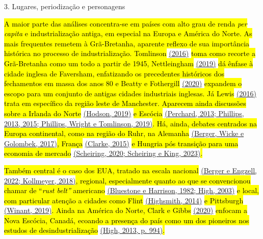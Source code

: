 3. Lugares, periodização e personagens

\hl{A maior parte das análises concentra-se em países com alto grau de
renda \emph{per capita} e industrialização antiga, em especial na Europa
e América do Norte. As mais frequentes remetem à Grã-Bretanha, aparente
reflexo de sua importância histórica no processo de industrialização.
Tomlinson} \href{https://www.zotero.org/google-docs/?PSiiOG}{(2016)}
\hl{toma como recorte a Grã-Bretanha como um todo a partir de 1945,
Nettleingham} \href{https://www.zotero.org/google-docs/?DzKgjo}{(2019)}
\hl{dá ênfase à cidade inglesa de Faversham, enfatizando os precedentes
históricos dos fechamentos em massa dos anos 80 e Beatty e Fothergill}
\href{https://www.zotero.org/google-docs/?iHJANV}{(2020)} \hl{expandem o
escopo para um conjunto de antigas cidades industriais inglesas. Já
Lewis} \href{https://www.zotero.org/google-docs/?cZ7T4H}{(2016)}
\hl{trata em específico da região leste de Manchester. Aparecem ainda
discussões sobre a Irlanda do Norte}
\href{https://www.zotero.org/google-docs/?adDhwJ}{(Hodson, 2019)} \hl{e
Escócia} \href{https://www.zotero.org/google-docs/?7OesxW}{(Perchard,
2013; Phillips, 2013, 2015; Phillips, Wright e Tomlinson, 2019)}\hl{.
Há, ainda, debates centrados na Europa continental, como na região do
Ruhr, na Alemanha}
\href{https://www.zotero.org/google-docs/?XOxNcJ}{(Berger, Wicke e
Golombek, 2017)}\hl{, França}
\href{https://www.zotero.org/google-docs/?SSjZ1w}{(Clarke, 2015)} \hl{e
Hungria pós transição para uma economia de mercado}
\href{https://www.zotero.org/google-docs/?i9n36z}{(Scheiring, 2020;
Scheiring e King, 2023)}\hl{.}

\hl{Também central é o caso dos EUA, tratado na escala nacional}
\href{https://www.zotero.org/google-docs/?JJF36r}{(Berger e Engzell,
2022; Kollmeyer, 2018)}\hl{, regional, especialmente quanto ao que se
convencionou chamar de ``\emph{rust belt''} americano}
\href{https://www.zotero.org/google-docs/?ZmBFJG}{(Bluestone e Harrison,
1982; High, 2003)} \hl{e local, com particular atenção a cidades como
Flint} \href{https://www.zotero.org/google-docs/?t9HVJz}{(Highsmith,
2014)} \hl{e Pittsburgh}
\href{https://www.zotero.org/google-docs/?SRxFGq}{(Winant, 2019)}\hl{.
Ainda na América do Norte, Clark e Gibbs}
\href{https://www.zotero.org/google-docs/?9HXi1x}{(2020)} \hl{enfocam a
Nova Escócia, Canadá, ecoando a presença do país como um dos pioneiros
nos estudos de desindustrialização}
\href{https://www.zotero.org/google-docs/?h6soGG}{(High, 2013, p.
994)}\hl{.}

